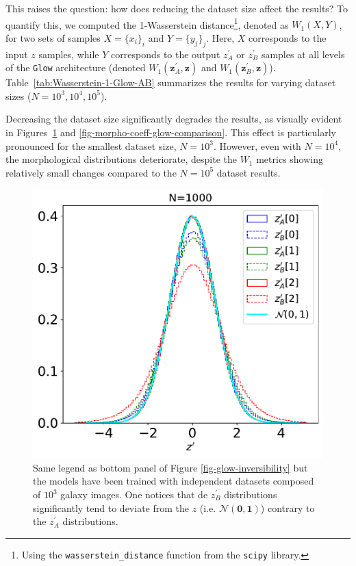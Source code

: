 \documentclass[fleqn,usenatbib]{mnras}
\begin{document}
This raises the question: how does reducing the dataset size affect the results? To quantify this, we computed the 1-Wasserstein distance\footnote{Using the \texttt{wasserstein\_distance} function from the \texttt{scipy} library.}, denoted as $W_1(X,Y)$, for two sets of samples $X = \{x_i\}_i$ and $Y = \{y_j\}_j$. Here, $X$ corresponds to the input $z$ samples, while $Y$ corresponds to the output $z^\prime_A$ or $z^\prime_B$ samples at all levels of the \texttt{Glow} architecture (denoted $W_1(\bm{z}^\prime_A, \bm{z})$ and $W_1(\bm{z}^\prime_B, \bm{z})$). Table~\ref{tab:Wasserstein-1-Glow-AB} summarizes the results for varying dataset sizes ($N=10^3, 10^4, 10^5$).

Decreasing the dataset size significantly degrades the results, as visually evident in Figures~\ref{fig-glow-inversibility-1000} and \ref{fig-morpho-coeff-glow-comparison}. This effect is particularly pronounced for the smallest dataset size, $N=10^3$. However, even with $N=10^4$, the morphological distributions deteriorate, despite the $W_1$ metrics showing relatively small changes compared to the $N=10^5$ dataset results.

\begin{figure}
    \centering
	\includegraphics[width=0.6\linewidth]{fig-glow_1000_test_inversibility_AB_blocks.pdf}
	\caption{Same legend as bottom panel of Figure \ref{fig-glow-inversibility} but the models have been trained with independent datasets composed of $10^3$ galaxy images. One notices that de $z_B^\prime$ distributions significantly tend to deviate from the $z$ (i.e. $\mathcal{N}(\bm{0},\bm{1})$) contrary to the $z_A^\prime$ distributions.}
	\label{fig-glow-inversibility-1000} 
\end{figure}
\end{document}
